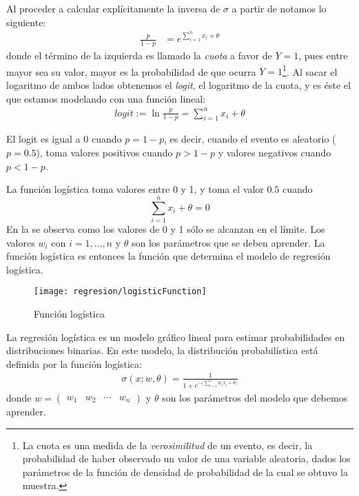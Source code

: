 Al proceder a calcular explícitamente la inversa de $\sigma$ a partir de  notamos lo siguiente:
\begin{align*}
 \frac{p}{1-p} &= e^{\sum_{i=1}^n x_i + \theta}
\end{align*}
donde el término de la izquierda es llamado la \emph{cuota} a favor de $Y=1$, pues entre mayor sea su valor, mayor es la probabilidad de que ocurra $Y=1$\footnote{La cuota es una medida de la \emph{verosimilitud} de un evento, es decir, la probabilidad de haber observado un valor de una variable aleatoria, dados los parámetros de la función de densidad de probabilidad de la cual se obtuvo la muestra. }.  Al sacar el logaritmo de ambos lados obtenemos el \emph{logit}, el logaritmo de la cuota, y es éste el que estamos modelando con una función lineal:
\begin{align*}
logit := \ln \frac{p}{1-p} = \sum_{i=1}^n x_i + \theta
\end{align*}

El logit es igual a 0 cuando $ p = 1-p$, es decir, cuando el evento es aleatorio ($p = 0.5$), toma valores positivos cuando $p > 1-p$ y valores negativos cuando $p < 1-p$.

La función logística toma valores entre 0 y 1, y toma el valor $0.5$ cuando $$\sum_{i=1}^n x_i + \theta = 0$$ En la  se observa como los valores de 0 y 1 sólo se alcanzan en el límite. Los valores $w_i$ con $i=1,...,n$ y $\theta$ son los parámetros que se deben aprender. La función logística es entonces la función que determina el modelo de regresión logística.


\begin{figure}
 \centering
 \texttt{[image: regresion/logisticFunction]}
 \caption{Función logística}\label{Fig:Logistic}
\end{figure}




\begin{definition}
La regresión logística es un modelo gráfico lineal para estimar probabilidades en distribuciones binarias. En este modelo, la distribución probabilística está definida por la función logística:
\begin{align*}
 \sigma(x; w, \theta) = \frac{1}{1 + e^{-\big(\sum_{i=1}^n w_i x_i + \theta\big)}}
\end{align*}
donde $w = \begin{pmatrix} w_1 & w_2 & \cdots & w_n \end{pmatrix}$ y $\theta$ son los parámetros del modelo que debemos aprender.
\end{definition}

